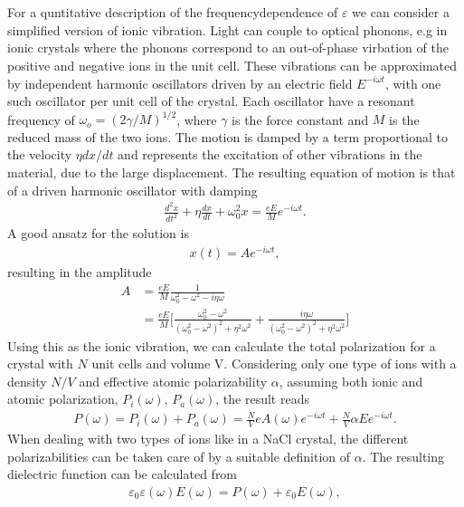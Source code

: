 %
\\
\\
For a quntitative description of the frequencydependence of $\varepsilon$ we can consider a simplified
version of ionic vibration.
Light can couple to optical phonons, e.g in ionic crystals where the phonons correspond to
an out-of-phase virbation of the positive and negative ions in the unit cell. 
These vibrations can be approximated by independent harmonic oscillators driven by an electric field
$E ^{-i\omega t}$, with one such oscillator per unit cell of the crystal. Each oscillator have a 
resonant frequency of $\omega_o = (2\gamma/M)^{1/2}$, where $\gamma$ is the force constant and
$M$ is the reduced mass of the two ions. The motion is damped by a term proportional to the velocity
$\eta d\!x\!/\!d\!t$ and represents the excitation of other vibrations in the material,
due to the large displacement. 
The resulting equation of motion is that of a driven harmonic oscillator with damping
\begin{align}
   \frac{d^2x}{dt^2} + \eta \frac{dx}{dt} + \omega_0^2 x = \frac{eE}{M}e^{-i\omega t}.
\end{align}
A good ansatz for the solution is 
\begin{align}
   x(t) = Ae^{-i \omega t},
\end{align}
resulting in the amplitude
\begin{align}
   A &= \frac{eE}{M} \frac{1}{\omega_0^2 - \omega^2 - i \eta \omega}  \\
     &=  \frac{eE}{M} \Bigg[ \frac{\omega_0^2 - \omega^2}{(\omega_0^2 - \omega^2)^2 +\eta^2 \omega^2} 
+ \frac{i\eta \omega}{(\omega_0^2 - \omega^2)^2 + \eta^2 \omega^2} \Bigg]
\end{align}
Using this as the ionic vibration, we can calculate the total polarization for a crystal with
$N$ unit cells and volume V. Considering only one type of ions with a density $N/V$ and effective
atomic polarizability $\alpha$, assuming both ionic and atomic polarization, $P_i(\omega)$, $P_a(\omega)$,
the result reads
\begin{align}
   P(\omega) = P_i(\omega) + P_a(\omega) = \frac{N}{V}eA(\omega)e^{-i \omega t} + \frac{N}{V}\alpha E e^{-i \omega t}.
\end{align}
When dealing with two types of ions like in a NaCl crystal, the different polarizabilities can be
taken care of by a suitable definition of $\alpha$. The resulting dielectric function can be calculated
from
\begin{align}
   \varepsilon_0 \varepsilon (\omega) E(\omega) = P(\omega) + \varepsilon_0 E(\omega),
\end{align}
